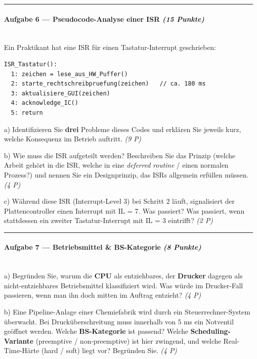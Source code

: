 \documentclass[11pt, a4paper]{article}
\begin{document}
\noindent\textcolor{rulegray}{\rule{\linewidth}{0.4pt}}


\paragraph{Aufgabe 6 — Pseudocode-Analyse einer ISR \textit{(15 Punkte)}}\mbox{}\\[2pt]

Ein Praktikant hat eine ISR für einen Tastatur-Interrupt geschrieben:


\begin{lstlisting}
ISR_Tastatur():
  1: zeichen = lese_aus_HW_Puffer()
  2: starte_rechtschreibpruefung(zeichen)   // ca. 180 ms
  3: aktualisiere_GUI(zeichen)
  4: acknowledge_IC()
  5: return
\end{lstlisting}


a) Identifizieren Sie \textbf{drei} Probleme dieses Codes und erklären Sie jeweils kurz, welche Konsequenz im Betrieb auftritt. \textit{(9 P)}


b) Wie muss die ISR aufgeteilt werden? Beschreiben Sie das Prinzip (welche Arbeit gehört in die ISR, welche in eine \textit{deferred routine} / einen normalen Prozess?) und nennen Sie ein Designprinzip, das ISRs allgemein erfüllen müssen. \textit{(4 P)}


c) Während diese ISR (Interrupt-Level 3) bei Schritt 2 läuft, signalisiert der Plattencontroller einen Interrupt mit IL = 7. Was passiert? Was passiert, wenn stattdessen ein zweiter Tastatur-Interrupt mit IL = 3 eintrifft? \textit{(2 P)}



\noindent\textcolor{rulegray}{\rule{\linewidth}{0.4pt}}


\paragraph{Aufgabe 7 — Betriebsmittel \& BS-Kategorie \textit{(8 Punkte)}}\mbox{}\\[2pt]

a) Begründen Sie, warum die \textbf{CPU} als entziehbares, der \textbf{Drucker} dagegen als nicht-entziehbares Betriebsmittel klassifiziert wird. Was würde im Drucker-Fall passieren, wenn man ihn doch mitten im Auftrag entzieht? \textit{(4 P)}


b) Eine Pipeline-Anlage einer Chemiefabrik wird durch ein Steuerrechner-System überwacht. Bei Drucküberschreitung muss innerhalb von 5 ms ein Notventil geöffnet werden. Welche \textbf{BS-Kategorie} ist passend? Welche \textbf{Scheduling-Variante} (preemptive / non-preemptive) ist hier zwingend, und welche Real-Time-Härte (hard / soft) liegt vor? Begründen Sie. \textit{(4 P)}
\end{document}
